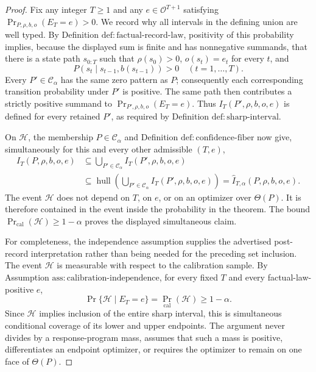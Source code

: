 \documentclass{article}
\begin{document}
\begin{proof}
Fix any integer \(T\ge1\) and any \(e\in\mathcal O^{T+1}\) satisfying \(\Pr_{P,\rho,b,o}(E_T=e)>0\).  We record why all intervals in the defining union are well typed.  By Definition \(\mathrm{def:factual\mbox{-}record\mbox{-}law}\), positivity of this probability implies, because the displayed sum is finite and has nonnegative summands, that there is a state path \(s_{0:T}\) such that \(\rho(s_0)>0\), \(o(s_t)=e_t\) for every \(t\), and
\[
 P(s_t\mid s_{t-1},b(s_{t-1}))>0
 \quad (t=1,\ldots,T).
\]
Every \(P'\in\mathcal C_{\alpha}\) has the same zero pattern as \(P\); consequently each corresponding transition probability under \(P'\) is positive.  The same path then contributes a strictly positive summand to \(\Pr_{P',\rho,b,o}(E_T=e)\).  Thus \(I_T(P',\rho,b,o,e)\) is defined for every retained \(P'\), as required by Definition \(\mathrm{def:sharp\mbox{-}interval}\).

On \(\mathcal H\), the membership \(P\in\mathcal C_{\alpha}\) and Definition \(\mathrm{def:confidence\mbox{-}fiber}\) now give, simultaneously for this and every other admissible \((T,e)\),
\[
 \begin{aligned}
 I_T(P,\rho,b,o,e)
 &\subseteq
 \bigcup_{P'\in\mathcal C_{\alpha}}I_T(P',\rho,b,o,e)\\
 &\subseteq
 \operatorname{hull}\!\left(
   \bigcup_{P'\in\mathcal C_{\alpha}}I_T(P',\rho,b,o,e)
 \right)
 =\widehat I_{T,\alpha}(P,\rho,b,o,e).
 \end{aligned}
\]
The event \(\mathcal H\) does not depend on \(T\), on \(e\), or on an optimizer over \(\Theta(P)\).  It is therefore contained in the event inside the probability in the theorem.  The bound \(\Pr_{\mathrm{cal}}(\mathcal H)\ge1-\alpha\) proves the displayed simultaneous claim.

For completeness, the independence assumption supplies the advertised post-record interpretation rather than being needed for the preceding set inclusion.  The event \(\mathcal H\) is measurable with respect to the calibration sample.  By Assumption \(\mathrm{ass:calibration\mbox{-}independence}\), for every fixed \(T\) and every factual-law-positive \(e\),
\[
 \Pr\{\mathcal H\mid E_T=e\}
 =\Pr_{\mathrm{cal}}(\mathcal H)
 \ge1-\alpha.
\]
Since \(\mathcal H\) implies inclusion of the entire sharp interval, this is simultaneous conditional coverage of its lower and upper endpoints.  The argument never divides by a response-program mass, assumes that such a mass is positive, differentiates an endpoint optimizer, or requires the optimizer to remain on one face of \(\Theta(P)\).
\end{proof}
\end{document}
